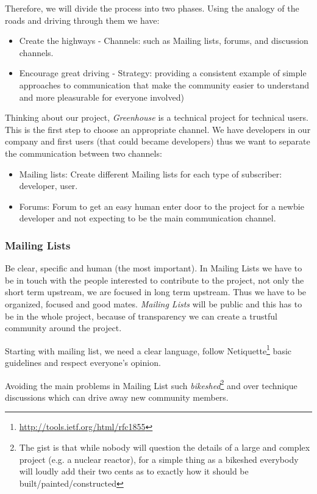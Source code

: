 \documentclass[11pt]{scrartcl}
\begin{document}
\par Therefore, we will divide the process into two phases. Using the analogy of the roads and driving through them we have:
\begin{itemize}
	\item Create the highways - Channels: such as Mailing lists, forums, and discussion channels.
    \item Encourage great driving - Strategy: providing a consistent example of simple approaches to communication that make the community easier to understand and more pleasurable for everyone involved)
\end{itemize}

\par Thinking about our project, \emph{Greenhouse} is a technical project for technical users. This is the first step to choose an appropriate channel. We have developers in our company and first users (that could became developers) thus we want to separate the communication between two channels:

\begin{itemize}
	\item Mailing lists: Create different Mailing lists for each type of subscriber: developer, user. 
	\item Forums: Forum to get an easy human enter door to the project for a newbie developer and not expecting to be the main communication channel.
\end{itemize}

\subsubsection{Mailing Lists}
\label{sub:mailing-lists}

\par Be clear, specific and human (the most important). In Mailing Lists we have to be in touch with the people interested to contribute to the project, not only the short term upstream, we are focused in long term upstream. Thus we have to be organized, focused and good mates. \emph{Mailing Lists} will be public and this has to be in the whole project, because of transparency we can create a trustful community around the project.

\par Starting with mailing list, we need a clear language, follow Netiquette\footnote{\url{http://tools.ietf.org/html/rfc1855}} basic guidelines and respect everyone’s opinion. 

\par Avoiding the main problems in Mailing List such \emph{bikeshed}\footnote{The gist is that while nobody will question the details of a large and complex project (e.g. a nuclear reactor), for a simple thing as a bikeshed everybody will loudly add their two cents as to exactly how it should be built/painted/constructed} and over technique discussions which can drive away new community members.
\end{document}
